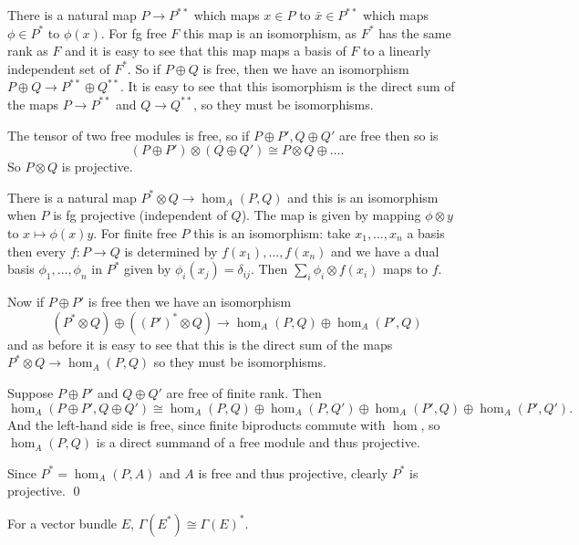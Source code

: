         \item There is a natural map $P\to P^{**}$ which maps $x\in P$ to $\bar x\in P^{**}$ which maps $\phi\in P^*$ to $\phi(x)$.
        For fg free $F$ this map is an isomorphism, as $F^*$ has the same rank as $F$ and it is easy to see that this map maps a basis of $F$ to a linearly independent set of $F^*$.
        So if $P\oplus Q$ is free, then we have an isomorphism $P\oplus Q\to P^{**}\oplus Q^{**}$.
        It is easy to see that this isomorphism is the direct sum of the maps $P\to P^{**}$ and $Q\to Q^{**}$, so they must be isomorphisms.

        \item The tensor of two free modules is free, so if $P\oplus P',Q\oplus Q'$ are free then so is
        $$ (P\oplus P')\otimes(Q\oplus Q') \cong P\otimes Q \oplus \dots . $$
        So $P\otimes Q$ is projective.

        \item There is a natural map $P^*\otimes Q\to\hom_A(P,Q)$ and this is an isomorphism when $P$ is fg projective (independent of $Q$).
        The map is given by mapping $\phi\otimes y$ to $x\mapsto \phi(x)y$.
        For finite free $P$ this is an isomorphism: take $x_1,\dots,x_n$ a basis then every $f\colon P\to Q$ is determined by $f(x_1),\dots,f(x_n)$ and we have a dual basis
        $\phi_1,\dots,\phi_n$ in $P^*$ given by $\phi_i(x_j)=\delta_{ij}$.
        Then $\sum_i\phi_i\otimes f(x_i)$ maps to $f$.

        Now if $P\oplus P'$ is free then we have an isomorphism
        $$ (P^*\otimes Q) \oplus ((P')^*\otimes Q) \to \hom_A(P,Q) \oplus \hom_A(P',Q) $$
        and as before it is easy to see that this is the direct sum of the maps $P^*\otimes Q\to\hom_A(P,Q)$ so they must be isomorphisms.

        \item Suppose $P\oplus P'$ and $Q\oplus Q'$ are free of finite rank.
        Then
        $$ \hom_A(P\oplus P',Q\oplus Q') \cong \hom_A(P,Q) \oplus \hom_A(P,Q') \oplus \hom_A(P',Q) \oplus \hom_A(P',Q') . $$
        And the left-hand side is free, since finite biproducts commute with $\hom$, so $\hom_A(P,Q)$ is a direct summand of a free module and thus projective.

        Since $P^*=\hom_A(P,A)$ and $A$ is free and thus projective, clearly $P^*$ is projective.
        \qed
    \eenum

\eproof

\bprop

    For a vector bundle $E$, $\Gamma(E^*)\cong\Gamma(E)^*$.

